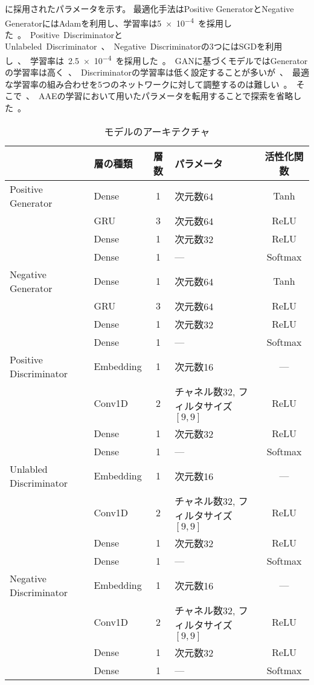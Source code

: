 に採用されたパラメータを示す。
最適化手法はPositive GeneratorとNegative GeneratorにはAdamを利用し、学習率は\SI{5e-4}を採用した。
Positive DiscriminatorとUnlabeled Discriminator、Negative Discriminatorの3つにはSGDを利用し、
学習率は\SI{2.5e-4}を採用した。
GANに基づくモデルではGeneratorの学習率は高く、Discriminatorの学習率は低く設定することが多いが、
最適な学習率の組み合わせを5つのネットワークに対して調整するのは難しい。
そこで、AAEの学習において用いたパラメータを転用することで探索を省略した。
\begin{table}[tbp]
\centering
\caption{モデルのアーキテクチャ} \label{tb:pugan_model_detail}
\begin{tabular}{llclc}\hline
& 層の種類 & 層数 & パラメータ & 活性化関数 \\\hline
Positive Generator & Dense & 1 & 次元数64 & Tanh \\
& GRU & 3 & 次元数64 & ReLU \\
& Dense & 1 & 次元数32 & ReLU \\
& Dense & 1 & --- & Softmax \\\hline
Negative Generator & Dense & 1 & 次元数64 & Tanh \\
& GRU & 3 & 次元数64 & ReLU \\
& Dense & 1 & 次元数32 & ReLU \\
& Dense & 1 & --- & Softmax \\\hline
Positive Discriminator & Embedding & 1 & 次元数16 & --- \\
& Conv1D & 2 & チャネル数32, フィルタサイズ$[9,9]$ & ReLU \\
& Dense & 1 & 次元数32 & ReLU \\
& Dense & 1 & --- & Softmax \\\hline
Unlabled Discriminator & Embedding & 1 & 次元数16 & --- \\
& Conv1D & 2 & チャネル数32, フィルタサイズ$[9,9]$ & ReLU \\
& Dense & 1 & 次元数32 & ReLU \\
& Dense & 1 & --- & Softmax \\\hline
Negative Discriminator & Embedding & 1 & 次元数16 & --- \\
& Conv1D & 2 & チャネル数32, フィルタサイズ$[9,9]$ & ReLU \\
& Dense & 1 & 次元数32 & ReLU \\
& Dense & 1 & --- & Softmax \\\hline
\end{tabular}
\end{table}

